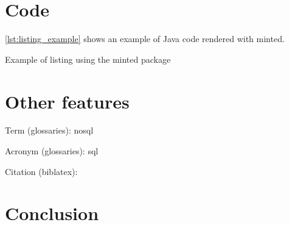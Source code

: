 \section{Code}

\autoref{lst:listing_example} shows an example of Java code rendered with minted.

\begin{listing}
	\caption{Example of listing using the minted package}
	\label{lst:listing_example}
\end{listing}

\section{Other features}

Term (glossaries): \gls{nosql}

Acronym (glossaries): \gls{sql}

Citation (biblatex): \cite{paper_millwheel}

\section{Conclusion}

\blindtext
